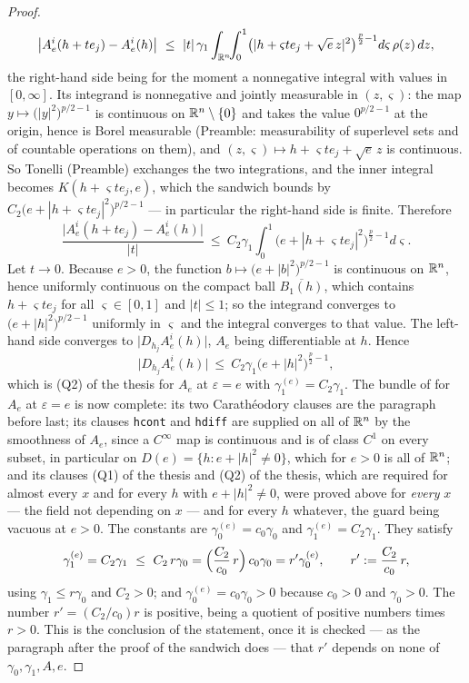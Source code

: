 \begin{proof}
\[
\bigl|A_e^i(h+te_j)-A_e^i(h)\bigr|
\ \le\ |t|\,\gamma_1\int_{\mathbb{R}^n}\!\!\int_0^1
\bigl(|h+\varsigma te_j+\sqrt e\,z|^2\bigr)^{\frac p2-1}d\varsigma\,\rho(z)\,dz ,
\]
the right-hand side being for the moment a nonnegative integral with values in
$[0,\infty]$.  Its integrand is nonnegative and jointly measurable in
$(z,\varsigma)$: the map $y\mapsto\bigl(|y|^2\bigr)^{p/2-1}$ is continuous on
$\mathbb{R}^n\setminus\{0\}$ and takes the value $0^{p/2-1}$ at the origin, hence is
Borel measurable (Preamble: measurability of superlevel sets and of countable
operations on them), and $(z,\varsigma)\mapsto h+\varsigma te_j+\sqrt e\,z$ is
continuous.  So Tonelli (Preamble) exchanges the two integrations, and the inner
integral becomes $K(h+\varsigma te_j,e)$, which the sandwich bounds by
$C_2\bigl(e+|h+\varsigma te_j|^2\bigr)^{p/2-1}$ --- in particular the
right-hand side is finite.  Therefore
\[
\frac{\bigl|A_e^i(h+te_j)-A_e^i(h)\bigr|}{|t|}
\ \le\ C_2\gamma_1\int_0^1\bigl(e+|h+\varsigma te_j|^2\bigr)^{\frac p2-1}d\varsigma .
\]
Let $t\to0$.  Because $e>0$, the function
$b\mapsto\bigl(e+|b|^2\bigr)^{p/2-1}$ is continuous on $\mathbb{R}^n$, hence uniformly
continuous on the compact ball $\overline{B_1(h)}$, which contains
$h+\varsigma te_j$ for all $\varsigma\in[0,1]$ and $|t|\le1$; so the integrand
converges to $\bigl(e+|h|^2\bigr)^{p/2-1}$ uniformly in $\varsigma$ and the
integral converges to that value.  The left-hand side converges to
$\bigl|D_{h_j}A_e^i(h)\bigr|$, $A_e$ being differentiable at $h$.  Hence
\[
\bigl|D_{h_j}A_e^i(h)\bigr|
\ \le\ C_2\gamma_1\bigl(e+|h|^2\bigr)^{\frac p2-1},
\]
which is (Q2) of the thesis for $A_e$ at $\varepsilon=e$ with
$\gamma_1^{(e)}=C_2\gamma_1$.  The bundle of 
for $A_e$ at $\varepsilon=e$ is now complete: its two Carath\'eodory clauses
are the paragraph before last; its clauses \texttt{hcont} and \texttt{hdiff}
are supplied on all of $\mathbb{R}^n$ by the smoothness of $A_e$, since a $C^\infty$
map is continuous and is of class $C^1$ on every subset, in particular on
$D(e)=\{h:e+|h|^2\ne0\}$, which for $e>0$ is all of $\mathbb{R}^n$; and its clauses
(Q1) of the thesis and (Q2) of the thesis, which are required for almost every $x$ and
for every $h$ with $e+|h|^2\ne0$, were proved above for \emph{every} $x$ ---
the field not depending on $x$ --- and for every $h$ whatever, the guard being
vacuous at $e>0$.  The constants are
$\gamma_0^{(e)}=c_0\gamma_0$ and $\gamma_1^{(e)}=C_2\gamma_1$.  They satisfy
\[
\gamma_1^{(e)}=C_2\gamma_1\ \le\ C_2\,r\gamma_0
=\Bigl(\frac{C_2}{c_0}\,r\Bigr)\,c_0\gamma_0=r'\gamma_0^{(e)},
\qquad r':=\frac{C_2}{c_0}\,r ,
\]
using $\gamma_1\le r\gamma_0$ and $C_2>0$; and $\gamma_0^{(e)}=c_0\gamma_0>0$
because $c_0>0$ and $\gamma_0>0$.  The number $r'=(C_2/c_0)r$ is positive,
being a quotient of positive numbers times $r>0$.  This is the conclusion of the
statement, once it is checked --- as the paragraph after the proof of the
sandwich does --- that $r'$ depends on none of $\gamma_0,\gamma_1,A,e$.


\end{proof}
